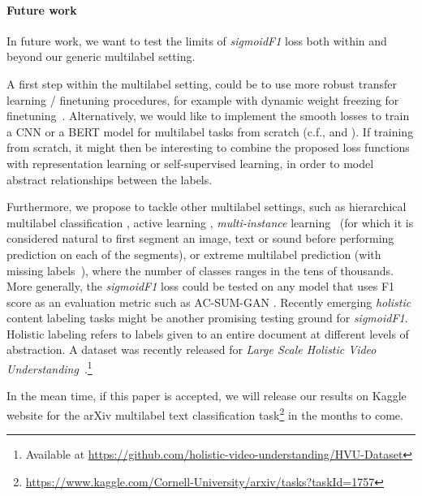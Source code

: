 \paragraph{Future work}
In future work, we want to test the limits of \emph{sigmoidF1} loss both within and beyond our generic multilabel setting.
%

A first step within the multilabel setting, could be to use more robust transfer learning / finetuning procedures, for example with dynamic weight freezing for finetuning~\cite{ULMFit}. Alternatively, we would like to implement the smooth losses to train a CNN or a BERT model for multilabel tasks from scratch (c.f., \cite{tencent} and \cite{focalLoss}). If training from scratch, it might then be interesting to combine the proposed loss functions with representation learning \cite{unsupervisedImage,highResRepresentation} or self-supervised learning, in order to model abstract relationships between the labels.

Furthermore, we propose to tackle other multilabel settings, such as hierarchical multilabel classification \cite{HARAM}, active learning \cite{activeLearningMultiLabel}, \emph{multi-instance} learning~\citep[e.g.,][]{multiInstance,multiInstanceMultiLabel} (for which it is considered natural to first segment an image, text or sound before performing prediction on each of the segments), or extreme multilabel prediction \cite{extremeMultilabelText, extremeSIGIR, extremeClassification, millionsOfLabels, extremeDiSMEC, extremePPDsparse, extremeParabel} (with missing labels~\cite{exteremeMissing, exteremeMissingApplications}), where the number of classes ranges in the tens of thousands. More generally, the \emph{sigmoidF1} loss could be tested on any model that uses F1 score as an evaluation metric such as AC-SUM-GAN \cite{AC-SUM-GAN}.
Recently emerging \textit{holistic} content labeling tasks might be another promising testing ground for \emph{sigmoidF1}. Holistic labeling refers to labels given to an entire document at different levels of abstraction. A dataset was recently released for \emph{Large Scale Holistic Video Understanding}~\cite{holisticVideoData}.\footnote{Available at \url{https://github.com/holistic-video-understanding/HVU-Dataset}}
\vspace{\baselineskip}

In the mean time, if this paper is accepted, we will release our results on Kaggle website for the arXiv multilabel text classification task\footnote{\url{https://www.kaggle.com/Cornell-University/arxiv/tasks?taskId=1757}} in the months to come.
\fi



